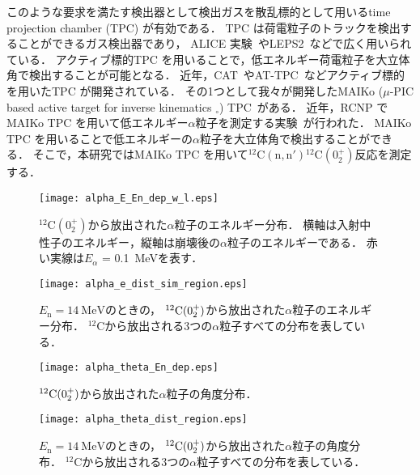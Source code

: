 \documentclass[../master]{subfiles}
\begin{document}
このような要求を満たす検出器として検出ガスを散乱標的として用いるtime projection chamber (TPC) が有効である．
TPC は荷電粒子のトラックを検出することができるガス検出器であり，
ALICE 実験~\cite{alice-tpc}やLEPS2~\cite{kobayakawa_thesis}などで広く用いられている．
アクティブ標的TPC を用いることで，低エネルギー荷電粒子を大立体角で検出することが可能となる．
近年，CAT~\cite{cat-tpc}やAT-TPC~\cite{at-tpc}などアクティブ標的を用いたTPC が開発されている．
その1つとして我々が開発したMAIKo ($\mu$-PIC based active target for inverse kinematics $_{\circ}$)
 TPC~\cite{maiko, mupic}がある．
近年，RCNP でMAIKo TPC を用いて低エネルギー$\alpha$粒子を測定する実験~\cite{Furuno2019}が行われた．
MAIKo TPC を用いることで低エネルギーの$\alpha$粒子を大立体角で検出することができる．
そこで，本研究ではMAIKo TPC を用いて${}^{12}\mathrm{C}(\mathrm{n},\mathrm{n}'){}^{12}\mathrm{C} (0_2^+)$反応を測定する．
\begin{figure}
  \centering
  \texttt{[image: alpha\_E\_En\_dep\_w\_l.eps]}
  \caption{${}^{12}\mathrm{C} (0_2^+)$から放出された$\alpha$粒子のエネルギー分布．
    横軸は入射中性子のエネルギー，縦軸は崩壊後の$\alpha$粒子のエネルギーである．
    赤い実線は$E_{\alpha}$ = \SI{0.1}{\mega\electronvolt}を表す．}
  \label{fig::alpha_E_En_dep_w_l}
\end{figure}
\begin{figure}
  \centering
  \texttt{[image: alpha\_e\_dist\_sim\_region.eps]}
  \caption[${}^{12}{\rm C} (0_2^+)$から放出された$\alpha$粒子のエネルギー分布．]
          {$E_{\mathrm{n}}=\SI{14}{\mega\electronvolt}$のときの，
            ${}^{12}{\rm C} (0_2^+)$から放出された$\alpha$粒子のエネルギー分布．
            ${}^{12}\mathrm{C}$から放出される3つの$\alpha$粒子すべての分布を表している．}
          \label{fig::alpha_E_dist}
\end{figure}
\begin{figure}
  \centering
  \texttt{[image: alpha\_theta\_En\_dep.eps]}
  \caption{${}^{12}{\rm C} (0_2^+)$から放出された$\alpha$粒子の角度分布．}
  \label{fig::alpha_theta_En_dep}
\end{figure}
\begin{figure}
  \centering
  \texttt{[image: alpha\_theta\_dist\_region.eps]}
  \caption[${}^{12}{\rm C} (0_2^+)$から放出された$\alpha$粒子の角度分布．]
          {$E_{\mathrm{n}}=\SI{14}{\mega\electronvolt}$のときの，
            ${}^{12}{\rm C} (0_2^+)$から放出された$\alpha$粒子の角度分布．
            ${}^{12}\mathrm{C}$から放出される3つの$\alpha$粒子すべての分布を表している．
          }
  \label{fig::alpha_theta_dist}
\end{figure}
\end{document}
